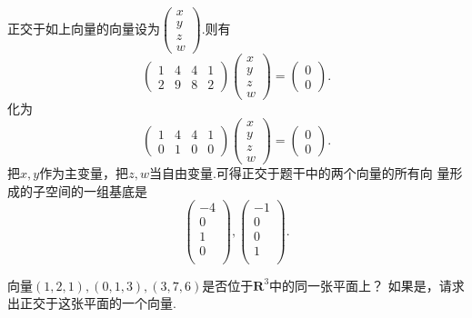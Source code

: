 ﻿\documentclass{book} \usepackage{exsheets} \usepackage{xeCJK}
\begin{document}
\begin{solution}
  正交于如上向量的向量设为$
  \begin{pmatrix}
    x\\
    y\\
    z\\
    w
  \end{pmatrix}
  $.则有
$$
\begin{pmatrix}
  1&4&4&1\\
  2&9&8&2
\end{pmatrix}
\begin{pmatrix}
  x\\
  y\\
  z\\
  w
\end{pmatrix}=
\begin{pmatrix}
  0\\
  0
\end{pmatrix}.
$$
化为
$$
\begin{pmatrix}
  1&4&4&1\\
  0&1&0&0
\end{pmatrix}
\begin{pmatrix}
  x\\
  y\\
  z\\
  w
\end{pmatrix}=
\begin{pmatrix}
  0\\
  0
\end{pmatrix}.
$$
把$x,y$作为主变量，把$z,w$当自由变量.可得正交于题干中的两个向量的所有向
量形成的子空间的一组基底是
$$
\begin{pmatrix}
  -4\\
  0\\
  1\\
  0\\
\end{pmatrix},
\begin{pmatrix}
  -1\\
  0\\
  0\\
  1\\
\end{pmatrix}.
$$
\end{solution}
\begin{question}
  向量$(1,2,1),(0,1,3),(3,7,6)$是否位于$\mathbf{R}^3$中的同一张平面上？
  如果是，请求出正交于这张平面的一个向量.
\end{question}
\end{document}
